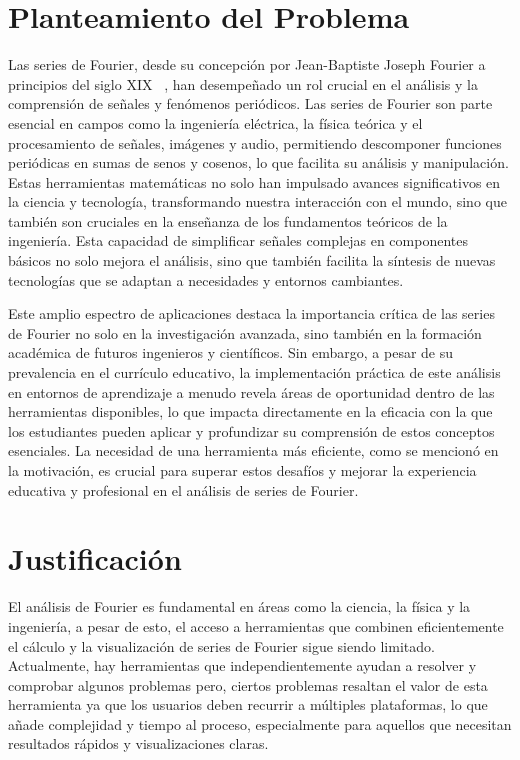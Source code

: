 \section{Planteamiento del Problema}
Las series de Fourier, desde su concepción por Jean-Baptiste Joseph Fourier a principios del siglo XIX ~\cite{almira2017fourier}, han desempeñado un rol crucial en el análisis y la comprensión de señales y fenómenos periódicos. Las series de Fourier son parte esencial en campos como la ingeniería eléctrica, la física teórica y el procesamiento de señales, imágenes y audio, permitiendo descomponer funciones periódicas en sumas de senos y cosenos, lo que facilita su análisis y manipulación. Estas herramientas matemáticas no solo han impulsado avances significativos en la ciencia y tecnología, transformando nuestra interacción con el mundo, sino que también son cruciales en la enseñanza de los fundamentos teóricos de la ingeniería. Esta capacidad de simplificar señales complejas en componentes básicos no solo mejora el análisis, sino que también facilita la síntesis de nuevas tecnologías que se adaptan a necesidades y entornos cambiantes.

Este amplio espectro de aplicaciones destaca la importancia crítica de las series de Fourier no solo en la investigación avanzada, sino también en la formación académica de futuros ingenieros y científicos. Sin embargo, a pesar de su prevalencia en el currículo educativo, la implementación práctica de este análisis en entornos de aprendizaje a menudo revela áreas de oportunidad dentro de las herramientas disponibles, lo que impacta directamente en la eficacia con la que los estudiantes pueden aplicar y profundizar su comprensión de estos conceptos esenciales. La necesidad de una herramienta más eficiente, como se mencionó en la motivación, es crucial para superar estos desafíos y mejorar la experiencia educativa y profesional en el análisis de series de Fourier.

\section{Justificación}
El análisis de Fourier es fundamental en áreas como la ciencia, la física y la ingeniería, a pesar de esto, el acceso a herramientas que combinen eficientemente el cálculo y la visualización de series de Fourier sigue siendo limitado. Actualmente, hay herramientas que independientemente ayudan a resolver y comprobar algunos problemas pero, ciertos problemas resaltan el valor de esta herramienta ya que los usuarios deben recurrir a múltiples plataformas, lo que añade complejidad y tiempo al proceso, especialmente para aquellos que necesitan resultados rápidos y visualizaciones claras.

